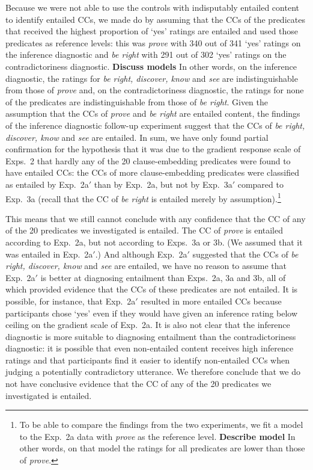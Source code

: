\documentclass[11pt,fleqn]{article}
\newcommand{\6}{\mbox{$[\hspace*{-.6mm}[$}}
\newcommand{\9}{\mbox{$]\hspace*{-.6mm}]$}}
\begin{document}
{Because we were not able to use the controls with indisputably entailed content to identify entailed CCs, we made do by assuming that the CCs of the predicates that received the highest proportion of `yes' ratings are entailed and used those predicates as reference levels: this was {\em prove} with 340 out of 341 `yes' ratings on the inference diagnostic and {\em be right} with 291 out of 302 `yes' ratings on the contradictoriness diagnostic. {\bf Discuss models} In other words, on the inference diagnostic, the ratings for {\em be right, discover, know} and {\em see} are indistinguishable from those of {\em prove} and, on the contradictoriness diagnostic, the ratings for none of the predicates are indistinguishable from those of {\em be right}. Given the assumption that the CCs of {\em prove} and {\em be right} are entailed content, the findings of the inference diagnostic follow-up experiment suggest that the CCs of {\em be right, discover, know} and {\em see} are entailed. In sum, we have only found partial confirmation for the hypothesis that it was due to the gradient response scale of Exps.~2 that hardly any of the 20 clause-embedding predicates were found to have entailed CCs: the CCs of more clause-embedding predicates were classified as entailed by Exp.~2a$'$ than by Exp.~2a, but not by Exp.~3a$'$ compared to Exp.~3a (recall that the CC of {\em be right} is entailed merely by assumption).\footnote{To be able to compare the findings from the two experiments, we fit a model to the Exp.~2a data with {\em prove} as the reference level. {\bf Describe model} In other words, on that model the ratings for all predicates are lower than those of {\em prove}.} 

This means that we still cannot conclude with any confidence that the CC of any of the 20 predicates we investigated is entailed. The CC of {\em prove} is entailed according to Exp.~2a, but not according to Exps.~3a or 3b. (We assumed that it was entailed in Exp.~2a$'$.) And although Exp.~2a$'$ suggested that the CCs of {\em be right, discover, know} and {\em see} are entailed, we have no reason to assume that Exp.~2a$'$ is better at diagnosing entailment than Exps.~2a, 3a and 3b, all of which provided evidence that the CCs of these predicates are not entailed. It is possible, for instance, that Exp.~2a$'$ resulted in more entailed CCs because participants chose `yes' even if they would have given an inference rating below ceiling on the gradient scale of Exp.~2a. It is also not clear that the inference diagnostic is more suitable to diagnosing entailment than the contradictoriness diagnostic: it is possible that even non-entailed content receives high inference ratings and that participants find it easier to identify non-entailed CCs when judging a potentially contradictory utterance. We therefore conclude that we do not have conclusive evidence that the CC of any of the 20 predicates we investigated is entailed.

}
\end{document}
